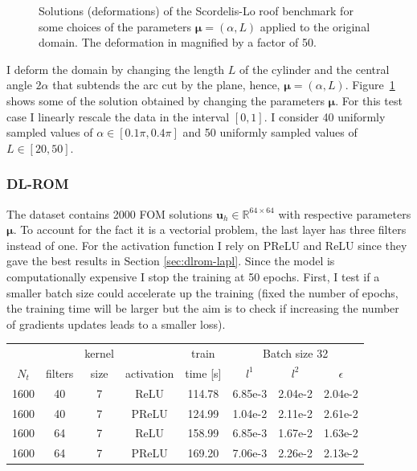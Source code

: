 \documentclass[11pt]{article}
\begin{document}
\begin{figure}
\begin{minipage}{.58\textwidth}
    \caption{Solutions (deformations) of the Scordelis-Lo roof benchmark for some choices of the parameters $\boldsymbol \mu=(\alpha, L)$ applied to the original domain. The deformation in magnified by a factor of 50.}
    \label{fig:scordelislo-sol}
\end{minipage}
\end{figure}


I deform the domain by changing the length $L$ of the cylinder and the central angle $2\alpha$ that subtends the arc cut by the plane, hence, $\boldsymbol \mu = (\alpha, L)$. Figure~\ref{fig:scordelislo-sol} shows some of the solution obtained by changing the parameters $\boldsymbol \mu$. For this test case I linearly rescale the data in the interval $[0, 1]$. I consider 40 uniformly sampled values of $\alpha \in [0.1\pi, 0.4\pi]$ and 50 uniformly sampled values of $L \in [20, 50]$.

\subsubsection{DL-ROM}
The dataset contains 2000 FOM solutions $\mathbf u_h \in \mathbb R^{64 \times 64}$ with respective parameters $\boldsymbol \mu$. To account for the fact it is a vectorial problem, the last layer has three filters instead of one. For the activation function I rely on PReLU and ReLU since they gave the best results in Section \ref{sec:dlrom-lapl}. Since the model is computationally expensive I stop the training at 50 epochs. First, I test if a smaller batch size could accelerate up the training (fixed the number of epochs, the training time will be larger but the aim is to check if increasing the number of gradients updates leads to a smaller loss).

\begin{center}
\begin{tabular}{ |c|c|c|c|c|c|c|c| } 
 &&kernel&&train&\multicolumn{3}{c|}{Batch size 32}\\
 $N_t$ & filters & size  &activation&  time [s] & $l^1$ & $l^2$ & $\epsilon$ \\ 
 \hline
 1600 & 40 & 7 & ReLU & 114.78 & 6.85e-3 & 2.04e-2 & 2.04e-2\\
 1600 & 40 & 7 & PReLU & 124.99 & 1.04e-2 & 2.11e-2 & 2.61e-2\\
 1600 & 64 & 7 & ReLU & 158.99 & 6.85e-3 & 1.67e-2 & 1.63e-2\\
 1600 & 64 & 7 & PReLU & 169.20 & 7.06e-3 & 2.26e-2 & 2.13e-2\\
\end{tabular}
\end{center}
\end{document}
